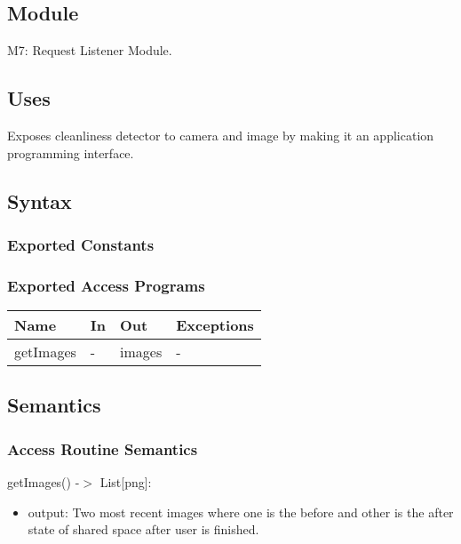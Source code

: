 \documentclass[12pt, titlepage]{article}
\begin{document}
\subsection{Module}

M7: Request Listener Module.

\subsection{Uses}
Exposes cleanliness detector to camera and image by making it an application programming interface.

\subsection{Syntax}

\subsubsection{Exported Constants}

\subsubsection{Exported Access Programs}

\begin{center}
\begin{tabular}{p{2cm} p{4cm} p{4cm} p{2cm}}
\hline
\textbf{Name} & \textbf{In} & \textbf{Out} & \textbf{Exceptions} \\
\hline
getImages & - & images & - \\
\hline
\end{tabular}
\end{center}

\subsection{Semantics}


\subsubsection{Access Routine Semantics}

\noindent getImages() -$>$ List[png]:
\begin{itemize}
\item output: Two most recent images where one is the before and other is the after state of shared space after user is finished.
\end{itemize}
\end{document}
